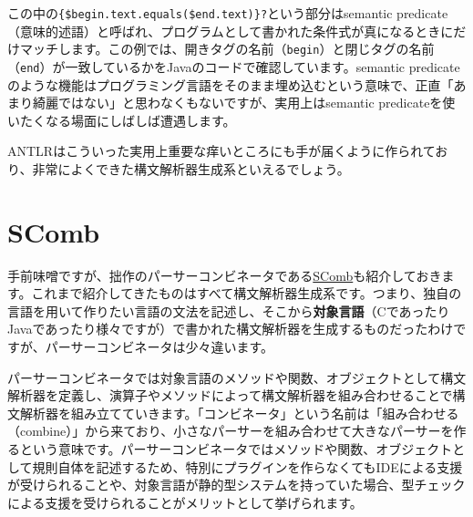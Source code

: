 \begin{Shaded}
\begin{Highlighting}[]
\CharTok{\textquotesingle{}\textless{}\textquotesingle{}}\CharTok{\textquotesingle{}\textgreater{}\textquotesingle{}}\CharTok{\textquotesingle{}\textgreater{}\textquotesingle{}}\NormalTok{ \{}
\NormalTok{)}
\end{Highlighting}
\end{Shaded}

この中の\texttt{\{\$begin.text.equals(\$end.text)\}?}という部分はsemantic
predicate（意味的述語）と呼ばれ、プログラムとして書かれた条件式が真になるときにだけマッチします。この例では、開きタグの名前（\texttt{begin}）と閉じタグの名前（\texttt{end}）が一致しているかをJavaのコードで確認しています。semantic
predicateのような機能はプログラミング言語をそのまま埋め込むという意味で、正直「あまり綺麗ではない」と思わなくもないですが、実用上はsemantic
predicateを使いたくなる場面にしばしば遭遇します。

ANTLRはこういった実用上重要な痒いところにも手が届くように作られており、非常によくできた構文解析器生成系といえるでしょう。

\hypertarget{chapter6-scomb}{%
\section{SComb}\label{chapter6-scomb}}

手前味噌ですが、拙作のパーサーコンビネータである\href{https://github.com/kmizu/scomb}{SComb}も紹介しておきます。これまで紹介してきたものはすべて構文解析器生成系です。つまり、独自の言語を用いて作りたい言語の文法を記述し、そこから\textbf{対象言語}（CであったりJavaであったり様々ですが）で書かれた構文解析器を生成するものだったわけですが、パーサーコンビネータは少々違います。

パーサーコンビネータでは対象言語のメソッドや関数、オブジェクトとして構文解析器を定義し、演算子やメソッドによって構文解析器を組み合わせることで構文解析器を組み立てていきます。「コンビネータ」という名前は「組み合わせる（combine）」から来ており、小さなパーサーを組み合わせて大きなパーサーを作るという意味です。パーサーコンビネータではメソッドや関数、オブジェクトとして規則自体を記述するため、特別にプラグインを作らなくてもIDEによる支援が受けられることや、対象言語が静的型システムを持っていた場合、型チェックによる支援を受けられることがメリットとして挙げられます。

